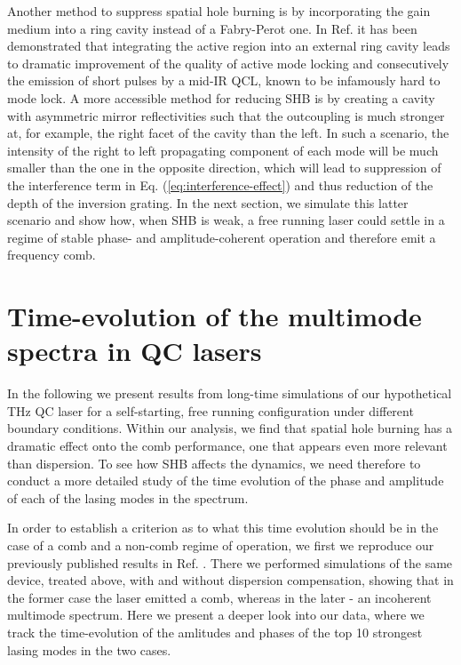 \documentclass[journal]{IEEEtran}
\begin{document}
	Another method to suppress spatial hole burning is by incorporating the gain medium into a ring cavity instead of a Fabry-Perot one. In Ref. \cite{revin2016active} it has been demonstrated that integrating the active region into an external ring cavity leads to dramatic improvement of the quality of active mode locking and consecutively the emission of short pulses by a mid-IR QCL, known to be infamously hard to mode lock. A more accessible method for reducing SHB is by creating a cavity with asymmetric mirror reflectivities such that the outcoupling is much stronger at, for example, the right facet of the cavity than the left. In such a scenario, the intensity of the right to left propagating component of each mode will be much smaller than the one in the opposite direction, which will lead to suppression of the interference term in Eq. (\ref{eq:interference-effect}) and thus reduction of the depth of the inversion grating. In the next section, we simulate this latter scenario and show how, when SHB is weak, a free running laser could settle in a regime of stable phase- and amplitude-coherent operation and therefore emit a frequency comb.

	\section{Time-evolution of the multimode spectra in QC lasers}
	\label{sec:time-evo}
	
	
	In the following we present results from long-time simulations of our hypothetical THz QC laser for a self-starting, free running configuration under different boundary conditions. Within our analysis, we find that spatial hole burning has a dramatic effect onto the comb performance, one that appears even more relevant than dispersion. To see how SHB affects the dynamics, we need therefore to conduct a more detailed study of the time evolution of the phase and amplitude of each of the lasing modes in the spectrum. 
	
	In order to establish a criterion as to what this time evolution should be in the case of a comb and a non-comb regime of operation, we first we reproduce our previously published results in Ref. \cite{petz2016}. There we performed simulations of the same device, treated above, with and without dispersion compensation, showing that in the former case the laser emitted a comb, whereas in the later - an incoherent multimode spectrum. Here we present a deeper look into our data, where we track the time-evolution of the amlitudes and phases of the top 10 strongest lasing modes in the two cases. 
	
\end{document}
